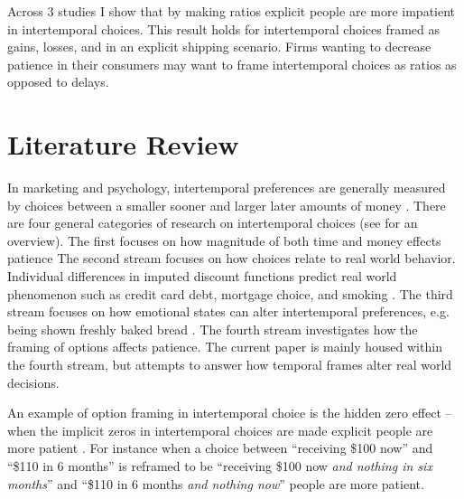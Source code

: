 \documentclass[]{article}
\begin{document}

Across 3 studies I show that by making ratios explicit people are more impatient in intertemporal choices. 
This result holds for intertemporal choices framed as gains, losses, and in an explicit shipping scenario. 
Firms wanting to decrease patience in their consumers may want to frame intertemporal choices as ratios as opposed to delays.
 

\section{Literature Review}

In marketing and psychology, intertemporal preferences are generally measured by choices between a smaller sooner and larger later amounts of money \cite{Zauberman2014}. 
There are four general categories of research on  intertemporal choices (see  for an overview).
The first focuses on how magnitude of both time and money effects patience \cite{Scholten2006, Thaler1981}
The second stream focuses on how choices relate to real world behavior.
Individual differences in imputed discount functions predict real world phenomenon such as credit card debt,  mortgage choice, and smoking \cite{MacKillop2011, Meier2009, Johnson2011}. 
The third stream focuses on how emotional states can alter intertemporal preferences, e.g. being shown freshly baked bread \cite{Li2008}. 
The fourth stream investigates how the framing of options affects patience. 
The current paper is mainly housed within the fourth stream, but attempts to answer how temporal frames alter real world decisions. 

An example of option framing in intertemporal choice is the hidden zero effect -- when the implicit zeros in intertemporal choices are made explicit people are more patient \cite{Magen2008}. 
For instance when a choice between ``receiving \$100 now'' and ``\$110 in 6 months'' is reframed to be  ``receiving \$100 now \textit{and nothing in six months}'' and ``\$110 in 6 months \textit{and nothing now}'' people are more patient. 
\end{document}
